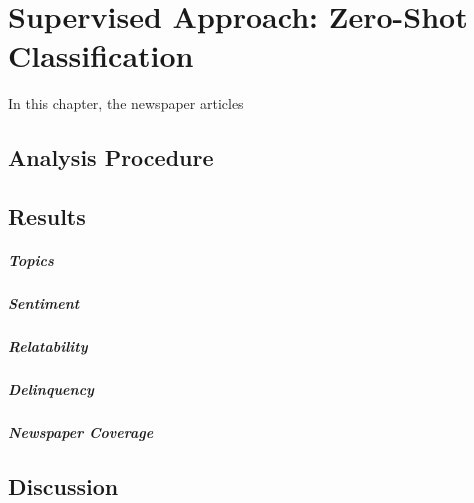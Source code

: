 \renewcommand{\imagepath}{../70-supervised/img}

\chapter{Supervised Approach: Zero-Shot Classification}\label{ch:supervised}
In this chapter, the newspaper articles 

\section{Analysis Procedure}

\section{Results}
\paragraph{Topics}
\paragraph{Sentiment}
\paragraph{Relatability}
\paragraph{Delinquency}
\paragraph{Newspaper Coverage}

\section{Discussion}